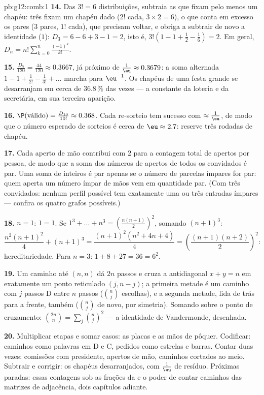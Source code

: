 \begin{solution}{pb:g12:comb:1}
\textbf{14.} Das $3! = 6$ distribuições, subtraia as que fixam
pelo menos um chapéu: três fixam um chapéu dado ($2!$ cada,
$3 \times 2 = 6$), o que conta em excesso os pares ($3$ pares,
$1!$ cada), que precisam voltar, e obriga a subtrair de novo a
identidade ($1$): $D_3 = 6 - 6 + 3 - 1 = 2$, isto é,
$3!\left(1 - 1 + \frac12 - \frac16\right) = 2$. Em geral,
$D_n = n!\sum_{k=0}^{n} \frac{(-1)^k}{k!}$.

\textbf{15.} $\frac{D_5}{120} = \frac{44}{120} \approx
0.3667$, já próximo de $\frac1\eu \approx 0.3679$: a soma
alternada $1 - 1 + \frac{1}{2!} - \frac{1}{3!} + \dots$ marcha
para $\eu^{-1}$. Os chapéus de uma festa grande se desarranjam
em cerca de $36.8\,\%$ das vezes --- a constante da loteria e da
secretária, em sua terceira aparição.

\textbf{16.} $\P(\text{válido}) = \frac{D_{10}}{10!} \approx
0.368$. Cada re-sorteio tem sucesso com 
$\approx \frac1\eu$, de modo que o número esperado de sorteios
é cerca de $\eu \approx 2.7$: reserve três rodadas de chapéu.

\textbf{17.} Cada aperto de mão contribui com $2$ para a
contagem total de apertos por pessoa, de modo que a soma dos
números de apertos de todos os convidados é par. Uma soma de
inteiros é par apenas se o número de parcelas ímpares for par:
quem aperta um número ímpar de mãos vem em quantidade par. (Com
três convidados: nenhum perfil possível tem exatamente uma ou
três entradas ímpares --- confira os quatro grafos
possíveis.)

\textbf{18.} $n = 1$: $1 = 1$. Se
$1^3 + \dots + n^3 = \left(\frac{n(n+1)}{2}\right)^2$, somando
$(n+1)^3$:
\[
\frac{n^2(n+1)^2}{4} + (n+1)^3
= \frac{(n+1)^2\left(n^2 + 4n + 4\right)}{4}
= \left(\frac{(n+1)(n+2)}{2}\right)^{\!2} :
\]
hereditariedade. Para $n = 3$: $1 + 8 + 27 = 36 = 6^2$.

\textbf{19.} Um caminho até $(n, n)$ dá $2n$ passos e cruza a
antidiagonal $x + y = n$ em exatamente um ponto reticulado
$(j, n - j)$; a primeira metade é um caminho com $j$ passos D
entre $n$ passos ($\binom nj$ escolhas), e a segunda metade,
lida de trás para a frente, também ($\binom nj$ de novo, por
simetria). Somando sobre o ponto de cruzamento:
$\binom{2n}{n} = \sum_j \binom nj^2$ --- a identidade de
Vandermonde, desenhada.

\textbf{20.} Multiplicar etapas e somar casos: as placas e as
mãos de pôquer. Codificar: caminhos como palavras em D e C,
pedidos como estrelas e barras. Contar duas vezes: comissões
com presidente, apertos de mão, caminhos cortados ao meio.
Subtrair e corrigir: os chapéus desarranjados, com $\frac1\eu$
de resíduo. Próximas paradas: essas contagens sob as frações da
 e o poder de contar caminhos das matrizes de
adjacência, dois capítulos adiante.
\end{solution}
